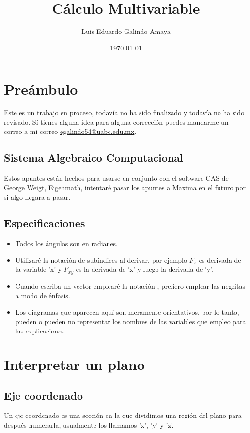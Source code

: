 \documentclass{article}
\author{Luis Eduardo Galindo Amaya}
\date{\today}
\title{Cálculo Multivariable}
\begin{document}
\maketitle
\tableofcontents


\section{Preámbulo}
\label{sec:org38793cc}
Este es un trabajo en proceso, todavía no ha sido finalizado y todavía no ha sido revisado. Sí tienes alguna idea para alguna corrección puedes mandarme un correo a mi correo \href{mailto:egalindo54@uabc.edu.mx}{egalindo54@uabc.edu.mx}.

\subsection{Sistema Algebraico Computacional}
\label{sec:orgfb15835}
Estos apuntes están hechos para usarse en conjunto con el software CAS de George Weigt, Eigenmath, intentaré pasar los apuntes a Maxima en el futuro por si algo llegara a pasar.

\subsection{Especificaciones}
\label{sec:org46ac76b}
\begin{itemize}
\item Todos los ángulos son en radianes.
\item Utilizaré la notación de subíndices al derivar, por ejemplo \(F_x\) es derivada de la variable 'x' y \(F_{xy}\) es la derivada de 'x' y luego la derivada de 'y'.
\item Cuando escriba un vector emplearé la notación , prefiero emplear las negritas a modo de énfasis.
\item Los diagramas que aparecen aquí son meramente orientativos, por lo tanto, pueden o pueden no representar los nombres de las variables que empleo para las explicaciones.
\end{itemize}

\section{Interpretar un plano}
\label{sec:org109eab9}
\subsection{Eje coordenado}
\label{sec:org9f88870}
Un eje coordenado es una sección en la que dividimos una región del plano para después numerarla, usualmente los llamamos 'x', 'y' y 'z'.
\end{document}
